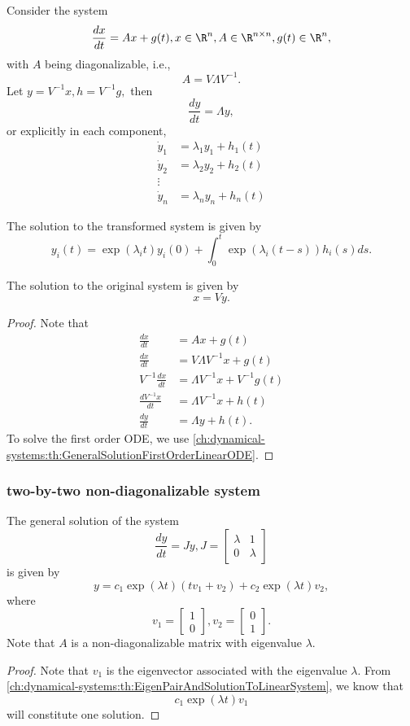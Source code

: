 \begin{refsection}
\begin{theorem}	Consider the system
	$$\frac{dx}{dt} = Ax + g(t), x\in \R^n, A\in \R^{n\times n}, g(t)\in\R^n,$$
	with $A$ being diagonalizable, i.e.,
	$$A = V\Lambda V^{-1}.$$
	Let $y = V^{-1}x, h = V^{-1}g,$ then
	$$\frac{dy}{dt} = \Lambda y,$$
	or explicitly in each component,
	\begin{align*}
	\dot{y}_1 &= \lambda_1 y_1 + h_1(t)\\
	\dot{y}_2 &= \lambda_2 y_2 + h_2(t)\\
	\vdots&\\
	\dot{y}_n &= \lambda_n y_n + h_n(t)
	\end{align*}
	
	The solution to the transformed system is given by
	$$y_i(t) = \exp(\lambda_i t)y_i(0) + \int_0^t \exp(\lambda_i (t-s))h_i(s) ds .$$
	
	The solution to the original system is given by	
	$$x=Vy.$$	
\end{theorem}
\begin{proof}
Note that
\begin{align*}
\frac{dx}{dt} &= Ax + g(t)\\
\frac{dx}{dt} &= V\Lambda V^{-1}x + g(t)\\
V^{-1}\frac{dx}{dt} &= \Lambda V^{-1}x + V^{-1}g(t)\\
\frac{dV^{-1}x}{dt} &= \Lambda V^{-1}x + h(t)\\
\frac{dy}{dt} &= \Lambda y + h(t). 
\end{align*}	
To solve the first order ODE, we use \autoref{ch:dynamical-systems:th:GeneralSolutionFirstOrderLinearODE}.
\end{proof}


\subsubsection{two-by-two non-diagonalizable system }
\begin{lemma}
	The general solution of the system
	$$\frac{dy}{dt} = Jy, J = \begin{bmatrix}
	\lambda & 1\\
	0 & \lambda
	\end{bmatrix}$$	
	is given by	
	$$y = c_1\exp(\lambda t)(tv_1 + v_2) + c_2\exp(\lambda t) v_2,$$
	where
	$$v_1 = \begin{bmatrix}
	1\\
	0
	\end{bmatrix},v_2 = \begin{bmatrix}
	0\\
	1
	\end{bmatrix}.$$
Note that $A$ is a non-diagonalizable matrix with eigenvalue $\lambda$.	
\end{lemma}
\begin{proof}
Note that $v_1$ is the eigenvector associated with the eigenvalue $\lambda$. From \autoref{ch:dynamical-systems:th:EigenPairAndSolutionToLinearSystem}, we know that
$$c_1\exp(\lambda t) v_1$$ will constitute one solution.
 	

\end{proof}
\end{refsection}
